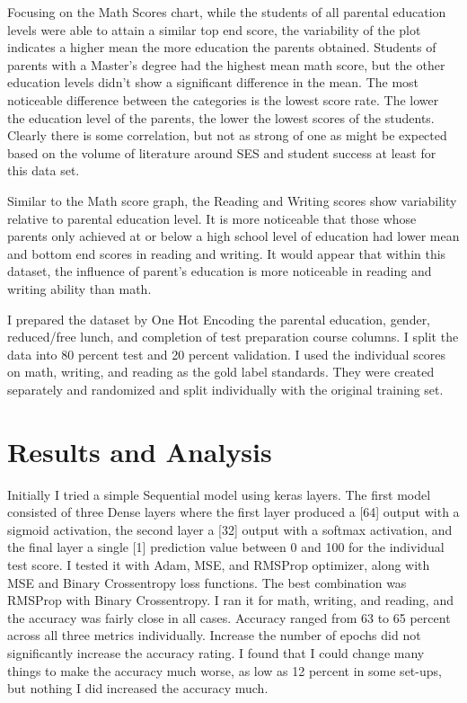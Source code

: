 \documentclass[fleqn,10pt]{olplainarticle}
\begin{document}
Focusing on the Math Scores chart, while the students of all parental education levels were able to attain a similar top end score, the variability of the plot indicates a higher mean the more education the parents obtained.  Students of parents with a Master's degree had the highest mean math score, but the other education levels didn't show a significant difference in the mean.  The most noticeable difference between the categories is the lowest score rate. The lower the education level of the parents, the lower the lowest scores of the students.  Clearly there is some correlation, but not as strong of one as might be expected based on the volume of literature around SES and student success at least for this data set.

Similar to the Math score graph, the Reading and Writing scores show variability relative to parental education level.  It is more noticeable that those whose parents only achieved at or below a high school level of education had lower mean and bottom end scores in reading and writing. It would appear that within this dataset, the influence of parent's education is more noticeable in reading and writing ability than math.

I prepared the dataset by One Hot Encoding the parental education, gender, reduced/free lunch, and completion of test preparation course columns. I split the data into 80 percent test and 20 percent validation.  I used the individual scores on math, writing, and reading as the gold label standards. They were created separately and randomized and split individually with the original training set.

\section*{Results and Analysis}
Initially I tried a simple Sequential model using keras layers. The first model consisted of three Dense layers where the first layer produced a [64]  output with a sigmoid activation, the second layer a [32] output with a softmax activation, and the final layer a single [1] prediction value between 0 and 100 for the individual test score.  I tested it with Adam, MSE, and RMSProp optimizer, along with MSE and Binary Crossentropy loss functions. The best combination was RMSProp with Binary Crossentropy. I ran it for math, writing, and reading, and the accuracy was fairly close in all cases. Accuracy ranged from 63 to 65 percent across all three metrics individually.  Increase the number of epochs did not significantly increase the accuracy rating.  I found that I could change many things to make the accuracy much worse, as low as 12 percent in some set-ups, but nothing I did increased the accuracy much.
\end{document}
